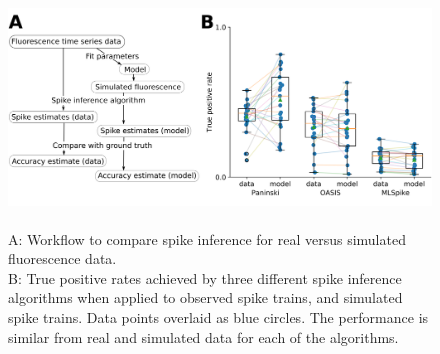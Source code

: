\documentclass[a4paper,12pt]{article}
\theoremstyle{definition}
\begin{document}
\begin{figure}[h]
\centering
  \includegraphics[width=\textwidth]{figures/Figure2.png}
  \caption{\\
  A: Workflow to compare spike inference for real versus simulated fluorescence data.\\
  B: True positive rates achieved by three different spike inference algorithms when applied to observed spike trains, and simulated spike trains. Data points overlaid as blue circles. The performance is similar from real and simulated data for each of the algorithms.}
  \label{fig:three_algo_comparison}
\end{figure}
\end{document}
